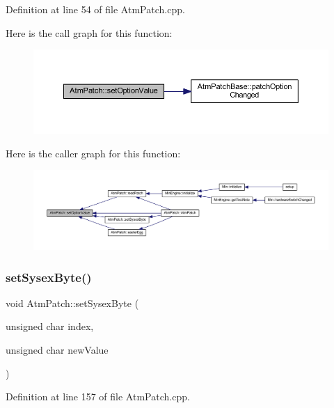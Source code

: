 Definition at line 54 of file Atm\+Patch.\+cpp.

Here is the call graph for this function\+:
\nopagebreak
\begin{figure}[H]
\begin{center}
\leavevmode
\includegraphics[width=350pt]{d9/de1/class_atm_patch_a1139606bcbffe63881b3f175f577d8e1_cgraph}
\end{center}
\end{figure}
Here is the caller graph for this function\+:
\nopagebreak
\begin{figure}[H]
\begin{center}
\leavevmode
\includegraphics[width=350pt]{d9/de1/class_atm_patch_a1139606bcbffe63881b3f175f577d8e1_icgraph}
\end{center}
\end{figure}
\mbox{\label{class_atm_patch_acc2729c3b10aa4d7f98e67caa3b80255}} 
\subsubsection{\texorpdfstring{set\+Sysex\+Byte()}{setSysexByte()}}
{\footnotesize\ttfamily void Atm\+Patch\+::set\+Sysex\+Byte (\begin{DoxyParamCaption}\item[{unsigned char}]{index,  }\item[{unsigned char}]{new\+Value }\end{DoxyParamCaption})}



Definition at line 157 of file Atm\+Patch.\+cpp.

